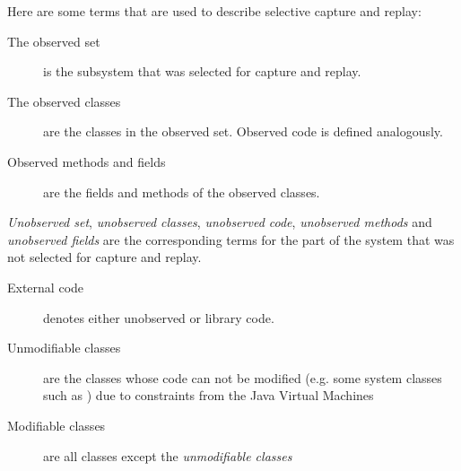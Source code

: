 Here are some terms that are used to describe selective capture and replay:
\begin{description}
	\item [The observed set] is the subsystem that was selected for capture and replay.
	\item [The observed classes] are the classes in the observed set. Observed code is defined analogously.
	\item [Observed methods and fields] are the fields and methods of the observed classes.
\end{description}
\emph{Unobserved set},  \emph{unobserved classes}, \emph{unobserved code}, \emph{unobserved methods} and \emph{unobserved fields} are the corresponding terms for the part of the system that was not selected for capture and replay.
\begin{description}
	\item [External code] denotes either unobserved or library code.
	\item [Unmodifiable classes] are the classes whose code can not be modified (e.g. some system classes such as ) due to constraints from the Java Virtual Machines
	\item [Modifiable classes] are all classes except the \emph{unmodifiable classes}
\end{description}

